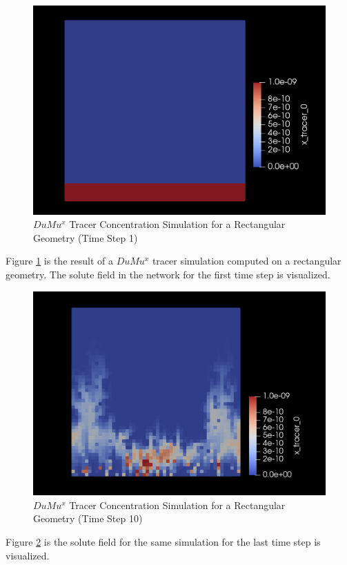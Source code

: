 \begin{figure}[h]
\centering
\includegraphics[width=162mm]{tracer_1}
\caption{\footnotesize $DuMu^x$ Tracer Concentration Simulation for a Rectangular Geometry (Time Step 1)}
\label{fig:tracer_1}
\end{figure}
Figure \ref{fig:tracer_1} is the result of a $DuMu^x$ tracer simulation computed on a rectangular geometry. The solute field in the network for the first time step is visualized.\\
\begin{figure}[h]
\centering
\includegraphics[width=162mm]{tracer_2}
\caption{\footnotesize $DuMu^x$ Tracer Concentration Simulation for a Rectangular Geometry (Time Step 10)}
\label{fig:tracer_2}
\end{figure}
Figure \ref{fig:tracer_2} is the solute field for the same simulation for the last time step is visualized.\\
